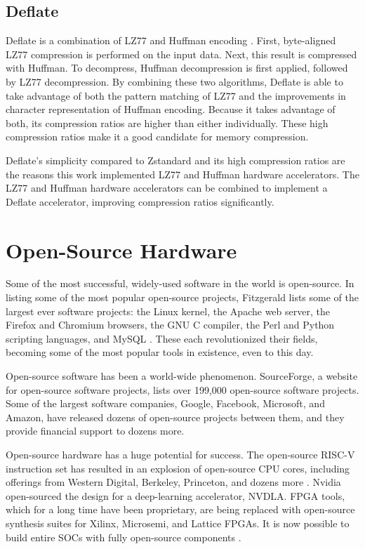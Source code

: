 \documentclass[doublespace,nopageskip]{VTthesis}
\begin{document}
\subsection{Deflate}\label{ss:deflate}
Deflate is a combination of LZ77 and Huffman encoding \cite{deflate}. First, byte-aligned LZ77 compression is performed on the input data. Next, this result is compressed with Huffman. To decompress, Huffman decompression is first applied, followed by LZ77 decompression. By combining these two algorithms, Deflate is able to take advantage of both the pattern matching of LZ77 and the improvements in character representation of Huffman encoding. Because it takes advantage of both, its compression ratios are higher than either individually. These high compression ratios make it a good candidate for memory compression.

Deflate's simplicity compared to Zstandard and its high compression ratios are the reasons this work implemented LZ77 and Huffman hardware accelerators. The LZ77 and Huffman hardware accelerators can be combined to implement a Deflate accelerator, improving compression ratios significantly.

\section{Open-Source Hardware}\label{se:open-source_motivation}
Some of the most successful, widely-used software in the world is open-source. In listing some of the most popular open-source projects, Fitzgerald lists some of the largest ever software projects: the Linux kernel, the Apache web server, the Firefox and Chromium browsers, the GNU C compiler, the Perl and Python scripting languages, and MySQL \cite{oss2.0}. These each revolutionized their fields, becoming some of the most popular tools in existence, even to this day.

Open-source software has been a world-wide phenomenon. SourceForge, a website for open-source software projects, lists over 199,000 open-source software projects. Some of the largest software companies, Google, Facebook, Microsoft, and Amazon, have released dozens of open-source projects between them, and they provide financial support to dozens more.

Open-source hardware has a huge potential for success. The open-source RISC-V instruction set has resulted in an explosion of open-source CPU cores, including offerings from Western Digital, Berkeley, Princeton, and dozens more \cite{boom, blackparrot, openpiton}. Nvidia open-sourced the design for a deep-learning accelerator, NVDLA. FPGA tools, which for a long time have been proprietary, are being replaced with open-source synthesis suites for Xilinx, Microsemi, and Lattice FPGAs. It is now possible to build entire SOCs with fully open-source components \cite{litex}.
\end{document}
